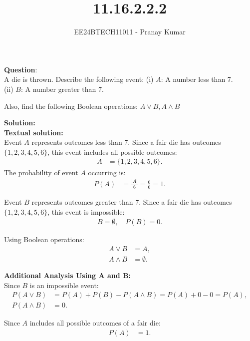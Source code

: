 \documentclass[journal]{IEEEtran}
\numberwithin{equation}{enumi}
\numberwithin{figure}{enumi}
\begin{document}

\vspace{3cm}

\title{11.16.2.2.2}
\author{EE24BTECH11011 - Pranay Kumar}
\maketitle

\textbf{Question}:\\
A die is thrown. Describe the following event:
(i) $ A $: A number less than 7.\\
(ii) $ B $: A number greater than 7.

Also, find the following Boolean operations: 
$ A \lor B, A \land B$

\textbf{Solution: }\\

\textbf{Textual solution: }\\
Event $ A $ represents outcomes less than 7. Since a fair die has outcomes $\{1, 2, 3, 4, 5, 6\}$, this event includes all possible outcomes:
\begin{align}
    A &= \{1, 2, 3, 4, 5, 6\}.
\end{align}
The probability of event $ A $ occurring is:
\begin{align}
    P(A) &= \frac{|A|}{6} = \frac{6}{6} = 1.
\end{align}

Event $ B $ represents outcomes greater than 7. Since a fair die has outcomes $\{1, 2, 3, 4, 5, 6\}$, this event is impossible:
\begin{align}
    B = \emptyset, \quad P(B) = 0.
\end{align}

Using Boolean operations:
\begin{align}
    A \lor B &= A, \\
    A \land B &= \emptyset.
\end{align}

\textbf{Additional Analysis Using A and B: }\\
Since $ B $ is an impossible event:
\begin{align}
    P(A \lor B) &= P(A) + P(B) - P(A \land B) = P(A) + 0 - 0 = P(A), \\
    P(A \land B) &= 0.
\end{align}

Since $ A $ includes all possible outcomes of a fair die:
\begin{align}
    P(A) &= 1.
\end{align}
\end{document}
